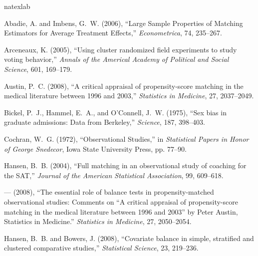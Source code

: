 \begin{frame}[allowframebreaks]
\nocite{hansen:2004,hansen:klopfer:2006}
{\scriptsize
% 
% 
\begin{thebibliography}{14}
\newcommand{\enquote}[1]{``#1''}
\expandafter\ifx\csname natexlab\endcsname\relax\def\natexlab#1{#1}\fi

Abadie, A. and Imbens, G.~W. (2006), \enquote{{Large Sample Properties of
  Matching Estimators for Average Treatment Effects},} \textit{Econometrica},
  74, 235--267.

Arceneaux, K. (2005), \enquote{Using cluster randomized field experiments to
  study voting behavior,} \textit{Annals of the Americal Academy of Political
  and Social Science}, 601, 169--179.

Austin, P.~C. (2008), \enquote{{A critical appraisal of propensity-score
  matching in the medical literature between 1996 and 2003},}
  \textit{Statistics in Medicine}, 27, 2037--2049.

Bickel, P.~J., Hammel, E.~A., and O'Connell, J.~W. (1975), \enquote{Sex bias in
  graduate admissions: Data from Berkeley,} \textit{Science}, 187, 398--403.

Cochran, W.~G. (1972), \enquote{Observational Studies,} in \textit{Statistical
  Papers in Honor of George Snedecor}, Iowa State University Press, pp. 77--90.

Hansen, B.~B. (2004), \enquote{Full matching in an observational study of
  coaching for the {SAT},} \textit{Journal of the American Statistical
  Association}, 99, 609--618.

--- (2008), \enquote{The essential role of balance tests in propensity-matched
  observational studies: Comments on ``A critical appraisal of propensity-score
  matching in the medical literature between 1996 and 2003'' by Peter Austin,
  Statistics in Medicine.} \textit{Statistics in Medicine}, 27, 2050--2054.

Hansen, B.~B. and Bowers, J. (2008), \enquote{Covariate balance in simple,
  stratified and clustered comparative studies,} \textit{Statistical Science},
  23, 219--236.


\end{thebibliography}}
\end{frame}
